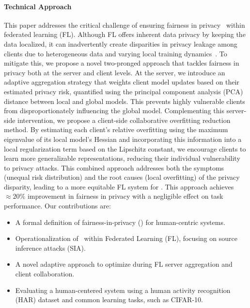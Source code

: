 \paragraph{\textbf{Technical Approach}}
This paper addresses the critical challenge of ensuring fairness in privacy \sysname\ within federated learning (FL). Although FL offers inherent data privacy by keeping the data localized, it can inadvertently create disparities in privacy leakage among clients due to heterogeneous data and varying local training dynamics~\cite{selialia2024mitigating}. To mitigate this, we propose a novel two-pronged approach that tackles fairness in privacy both at the server and client levels. At the server, we introduce an adaptive aggregation strategy that weights client model updates based on their estimated privacy risk, quantified using the principal component analysis (PCA) distance between local and global models. This prevents highly vulnerable clients from disproportionately influencing the global model. Complementing this server-side intervention, we propose a client-side collaborative overfitting reduction method. By estimating each client's relative overfitting using the maximum eigenvalue of its local model's Hessian and incorporating this information into a local regularization term based on the Lipschitz constant, we encourage clients to learn more generalizable representations, reducing their individual vulnerability to privacy attacks. This combined approach addresses both the symptoms (unequal risk distribution) and the root causes (local overfitting) of the privacy disparity, leading to a more equitable FL system for \sysname. This approach achieves $\approx 20\%$ improvement in fairness in privacy with a negligible effect on task performance. Our contributions are:

 \begin{itemize}[noitemsep, topsep=0pt]
\item A formal definition of fairness-in-privacy (\sysname) for human-centric systems.
\item Operationalization of \sysname\ within Federated Learning (FL), focusing on source inference attacks (SIA).
\item A novel adaptive approach to optimize \sysname during FL server aggregation and client collaboration.
\item Evaluating a human-centered system using a human activity recognition (HAR) dataset and common learning tasks, such as CIFAR-10. %
\end{itemize}



